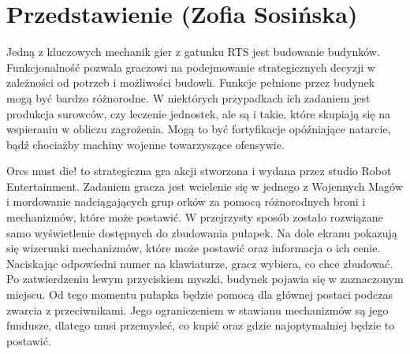 \section{Przedstawienie  (Zofia Sosińska)}\label{chap:omd}
Jedną z kluczowych mechanik gier z gatunku RTS jest budowanie budynków. Funkcjonalność pozwala graczowi 
na podejmowanie strategicznych decyzji w zależności od potrzeb i możliwości budowli. Funkcje pełnione 
przez budynek mogą być bardzo różnorodne. W niektórych przypadkach ich zadaniem jest produkcja surowców, czy leczenie
jednostek, ale są i takie, które skupiają się na wspieraniu w obliczu zagrożenia. Mogą to być fortyfikacje opóźniające natarcie,
bądź chociażby machiny wojenne towarzyszące ofensywie.

Orcs must die! to strategiczna gra akcji stworzona i wydana przez studio Robot Entertainment. Zadaniem gracza jest wcielenie się
w jednego z  Wojennych Magów i mordowanie nadciągających grup orków za pomocą różnorodnych broni i mechanizmów, które może postawić.
W przejrzysty sposób zostało rozwiązane samo wyświetlenie dostępnych do zbudowania pułapek. Na dole ekranu pokazują się wizerunki mechanizmów,
które może postawić oraz informacja o ich cenie. Naciskając odpowiedni numer na klawiaturze, gracz wybiera, co chce zbudować. Po zatwierdzeniu lewym przyciskiem myszki,
budynek pojawia się w zaznaczonym miejscu. Od tego momentu pułapka będzie pomocą dla głównej postaci podczas zwarcia z przeciwnikami.
Jego ograniczeniem w stawianu mechanizmów są jego fundusze, dlatego musi przemysleć, co kupić oraz gdzie najoptymalniej będzie to postawić.

